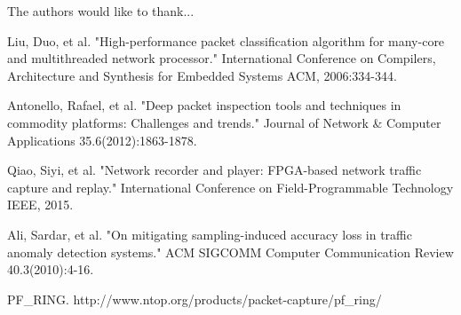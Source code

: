\documentclass[conference]{IEEEtran}
\begin{document}
The authors would like to thank...







%
%
%
\begin{thebibliography}{1}

  Liu, Duo, et al. "High-performance packet classification algorithm for many-core and multithreaded network processor." International Conference on Compilers, Architecture and Synthesis for Embedded Systems ACM, 2006:334-344.
  
  Antonello, Rafael, et al. "Deep packet inspection tools and techniques in commodity platforms: Challenges and trends." Journal of Network \& Computer Applications 35.6(2012):1863-1878.
  
  Qiao, Siyi, et al. "Network recorder and player: FPGA-based network traffic capture and replay." International Conference on Field-Programmable Technology IEEE, 2015.
  
  Ali, Sardar, et al. "On mitigating sampling-induced accuracy loss in traffic anomaly detection systems." ACM SIGCOMM Computer Communication Review 40.3(2010):4-16.
  
  PF\_RING. http://www.ntop.org/products/packet-capture/pf\_ring/
\end{thebibliography}




\end{document}
